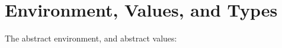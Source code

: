 \documentclass[12pt,twoside]{report}
\begin{document}









\section{Environment, Values, and Types}
The abstract environment, and abstract values:
\end{document}
